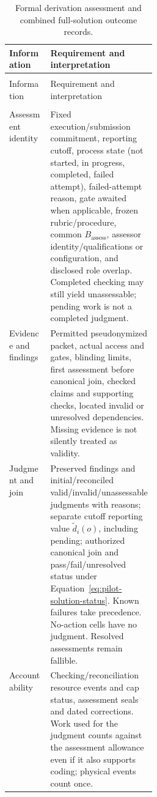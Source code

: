\documentclass[10pt]{article} %
\providecommand{\1}{\mathbf{1}}  %
\theoremstyle{remark}
\theoremstyle{definition}
\begin{document}
\begingroup
\footnotesize
\renewcommand{\arraystretch}{1.13}
\setlength{\LTpre}{6pt}
\setlength{\LTpost}{8pt}
\setlength{\LTcapwidth}{\linewidth}
\begin{longtable}{@{}>{\raggedright\arraybackslash}p{0.28\linewidth}>{\raggedright\arraybackslash}p{}@{}}
\caption{Formal derivation assessment and combined full-solution outcome records.}\label{tab:solution-assessment-ledger}\\
\toprule
Information & Requirement and interpretation \\
\midrule
\endfirsthead
\multicolumn{2}{@{}l}{\textit{Table \thetable\ continued}}\\
\toprule
Information & Requirement and interpretation \\
\midrule
\endhead
\midrule
\multicolumn{2}{r@{}}{\textit{Continued on next page}}\\
\endfoot
\bottomrule
\endlastfoot

Assessment identity & Fixed execution/submission commitment, reporting cutoff, process state (not started, in progress, completed, failed attempt), failed-attempt reason, gate awaited when applicable, frozen rubric/procedure, common $B_{\mathrm{assess}}$, assessor identity/qualifications or configuration, and disclosed role overlap. Completed checking may still yield unassessable; pending work is not a completed judgment. \\
Evidence and findings & Permitted pseudonymized packet, actual access and gates, blinding limits, first assessment before canonical join, checked claims and supporting checks, located invalid or unresolved dependencies. Missing evidence is not silently treated as validity. \\
Judgment and join & Preserved findings and initial/reconciled valid/invalid/unassessable judgments with reasons; separate cutoff reporting value $\widetilde d_i(o)$, including pending; authorized canonical join and pass/fail/unresolved status under Equation~\ref{eq:pilot-solution-status}. Known failures take precedence. No-action cells have no judgment. Resolved assessments remain fallible. \\
Accountability & Checking/reconciliation resource events and cap status, assessment seals and dated corrections. Work used for the judgment counts against the assessment allowance even if it also supports coding; physical events count once. \\
\end{longtable}
\endgroup
\end{document}
